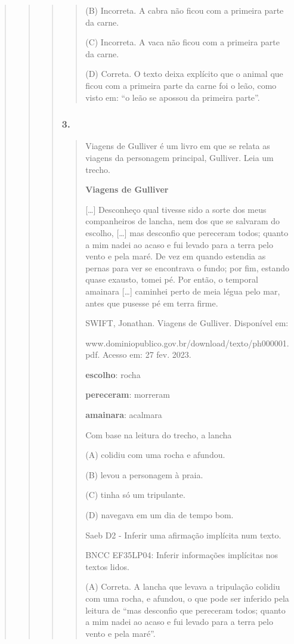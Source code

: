 \begin{quote}
\begin{quote}
\begin{quote}
\begin{quote}
(B) Incorreta. A cabra não ficou com a primeira parte da carne.

(C) Incorreta. A vaca não ficou com a primeira parte da carne.

(D) Correta. O texto deixa explícito que o animal que ficou com a
primeira parte da carne foi o leão, como visto em: ``o leão se apossou
da primeira parte''.
\end{quote}

\subsubsection{3. }\label{section-82}

\begin{quote}
Viagens de Gulliver é um livro em que se relata as viagens da personagem
principal, Gulliver. Leia um trecho.

\textbf{Viagens de Gulliver}

{[}\ldots{}{]} Desconheço qual tivesse sido a sorte dos meus
companheiros de lancha, nem dos que se salvaram do escolho,
{[}\ldots{}{]} mas desconfio que pereceram todos; quanto a mim nadei ao
acaso e fui levado para a terra pelo vento e pela maré. De vez em quando
estendia as pernas para ver se encontrava o fundo; por fim, estando
quase exausto, tomei pé. Por então, o temporal amainara {[}\ldots{}{]}
caminhei perto de meia légua pelo mar, antes que pusesse pé em terra
firme.

SWIFT, Jonathan. Viagens de Gulliver. Disponível em:

www.dominiopublico.gov.br/download/texto/ph000001.pdf. Acesso em: 27
fev. 2023.

\textbf{escolho}: rocha

\textbf{pereceram}: morreram

\textbf{amainara}: acalmara

Com base na leitura do trecho, a lancha

(A) colidiu com uma rocha e afundou.

(B) levou a personagem à praia.

(C) tinha só um tripulante.

(D) navegava em um dia de tempo bom.

Saeb D2 - Inferir uma afirmação implícita num texto.

BNCC EF35LP04: Inferir informações implícitas nos textos lidos.

(A) Correta. A lancha que levava a tripulação colidiu com uma rocha, e
afundou, o que pode ser inferido pela leitura de ``mas desconfio que
pereceram todos; quanto a mim nadei ao acaso e fui levado para a terra
pelo vento e pela maré''.


\end{quote}
\end{quote}
\end{quote}
\end{quote}
